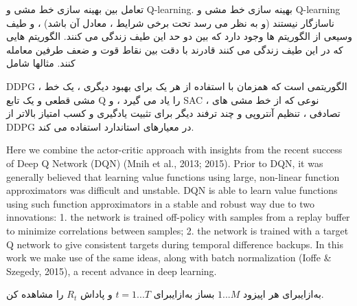 تعامل بین بهینه سازی خط مشی و Q-learning. بهینه سازی خط مشی و Q-learning ناسازگار نیستند (و به نظر می رسد تحت برخی شرایط ، معادل آن باشد) ، و طیف وسیعی از الگوریتم ها وجود دارد که بین دو حد این طیف زندگی می کنند. الگوریتم هایی که در این طیف زندگی می کنند قادرند با دقت بین نقاط قوت و ضعف طرفین معامله کنند. مثالها شامل

DDPG
 ، الگوریتمی است که همزمان با استفاده از هر یک برای بهبود دیگری ، یک خط مشی قطعی و یک تابع Q را یاد می گیرد ،
و SAC ، نوعی که از خط مشی های تصادفی ، تنظیم آنتروپی  و چند ترفند دیگر برای تثبیت یادگیری و کسب امتیاز بالاتر از DDPG در معیارهای استاندارد استفاده می کند.


Here we combine the actor-critic approach with insights from the recent success of Deep Q Network
(DQN) (Mnih et al., 2013; 2015). Prior to DQN, it was generally believed that learning value
functions using large, non-linear function approximators was difficult and unstable. DQN is able
to learn value functions using such function approximators in a stable and robust way due to two
innovations: 1. the network is trained off-policy with samples from a replay buffer to minimize
correlations between samples; 2. the network is trained with a target Q network to give consistent
targets during temporal difference backups. In this work we make use of the same ideas, along with
batch normalization (Ioffe & Szegedy, 2015), a recent advance in deep learning.


\‌به‌ازای{برای هر اپیزود $1...M$}
 بساز
\‌به‌ازای{برای $t=1...T$}
 و پاداش $R_t$ را مشاهده کن.
    
